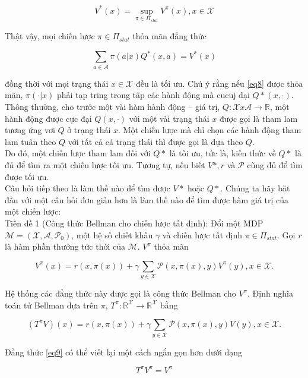 \documentclass[14pt,a4paper,oneside]{report}		%
\begin{document}
$$V^*(x) = \displaystyle\sup_{\pi\in\Pi_{stat}} V^\pi(x),  x\in\mathcal{X}$$

Thật vậy, mọi chiến lược $\pi\in\Pi_{stat}$ thỏa mãn đẳng thức

\begin{equation} \label{eq8}
\sum_{a\in\mathcal{A}}{\pi (a|x)Q^*(x,a)} = V^*(x)
\end{equation}

đồng thời với mọi trạng thái $x \in \mathcal{X}$ đều là tối ưu. Chú ý rằng nếu \ref{eq8} được thỏa mãn, $\pi(\cdotp|x)$ phải tạp tring trong tập các hành động mà cucuj dại $Q*(x,\cdotp)$. Thông thường, cho trước một vài hàm hành động – giá trị, $Q:\mathcal{X}x\mathcal{A}\rightarrow\mathbb{R}$, một hành động được cực đại $Q(x,\cdotp)$ với một vài trạng thái $x$ được gọi là tham lam tương ứng vơi $Q$ ở trạng thái $x$. Một chiến lược mà chỉ chọn các hành động tham lam tuân theo $Q$ với tất cả cá trạng thái thì được gọi là dựa theo $Q$. \\
Do đó, một chiến lược tham lam đối với $Q*$ là tối ưu, tức là, kiến thức về $Q*$ là đủ để tìm ra một chiến lược tối ưu. Tương tự, nếu biết $V* ,r$ và $\mathcal{P}$ cũng đủ để tìm được tối ưu. \\
Câu hỏi tiếp theo là làm thế nào để tìm được $V*$ hoặc $Q*$. Chúng ta hãy băt đầu với một câu hỏi đơn giản hơn là làm thế nào để tìm được hàm giá trị của một chiến lược: \\
Tiên đề 1 (Công thức Bellman cho chiến lược tất định): Đổi một MDP $\mathcal{M} = (\mathcal{X},\mathcal{A},\mathcal{P}_0)$, một hệ số chiết khấu $\gamma$ và chiến lược tất định $\pi \in \Pi_{stat}$. Gọi $r$ là hàm phần thưởng tức thời của $\mathcal{M}$. $V^\pi$ thỏa mãn

\begin{equation} \label{eq9}
V^\pi(x) = r(x,\pi(x)) + \gamma \displaystyle\sum_{y\in\mathcal{X}}{\mathcal{P}(x,\pi(x),y)V^\pi(y)}, x\in\mathcal{X}.
\end{equation}

Hệ thống các đẳng thức này được gọi là công thức Bellman cho $V^\pi$. Định nghĩa toán tử Bellman dựa trên $\pi$, $T^\pi : \mathbb{R}^{\mathcal{X}}\rightarrow\mathbb{R}^{\mathcal{X}}$ bằng

$$(T^\pi V)(x) = r(x,\pi(x)) + \gamma \displaystyle\sum_{y\in\mathcal{X}}{\mathcal{P}(x,\pi(x),y)V(y)}, x\in\mathcal{X}.$$

Đẳng thức \ref{eq9} có thể viết lại một cách ngắn gọn hơn dưới dạng

\begin{equation} \label{eq10}
T^\pi V^\pi =V^\pi
\end{equation}
\end{document}
